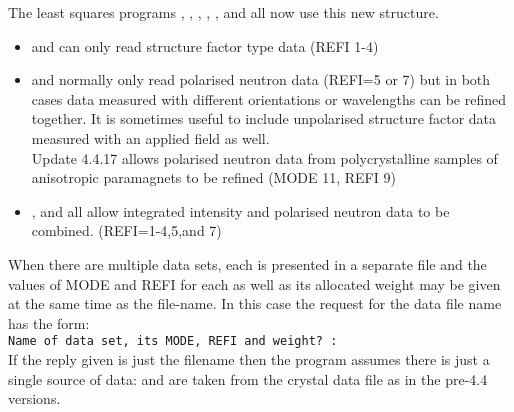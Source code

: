 The least squares programs , , , , ,  and 
all now use this new structure. 
\begin{itemize}
\item {}  and   can only read structure factor type data (REFI 1-4)
\item {} and  normally only read polarised neutron data (REFI=5 or 7)
but in both cases data measured with different orientations or wavelengths
can be refined together. It is sometimes useful to include unpolarised structure factor data
measured with an applied field as well. \\
Update 4.4.17 allows polarised neutron data from  polycrystalline samples of anisotropic
paramagnets to be refined (MODE 11, REFI 9)

\item {},  and  all allow integrated intensity and polarised neutron data to be combined. (REFI=1-4,5,and 7)
\end{itemize}
When there are multiple data sets, each is presented in a separate file and the 
values of MODE and REFI for each as well as its allocated weight may be given at the same time as the file-name. 
In this case the request for the data file name has the form:\\
{\tt Name of data set, its MODE, REFI and weight? :}\\
If the reply given is just the filename then the program assumes there is just a
 single source of data:  and  are taken from the crystal data file 
 as in the pre-4.4 versions.
